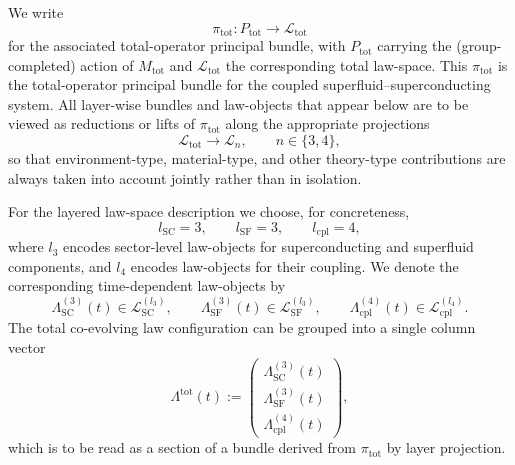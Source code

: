 \documentclass[11pt]{book}
\theoremstyle{plain}
\theoremstyle{definition}
\theoremstyle{remark}
\begin{document}
We write
\begin{equation}
  \pi_{\mathrm{tot}} : P_{\mathrm{tot}} \to \mathcal{L}_{\mathrm{tot}}
\end{equation}
for the associated total-operator principal bundle, with $P_{\mathrm{tot}}$
carrying the (group-completed) action of $M_{\mathrm{tot}}$ and
$\mathcal{L}_{\mathrm{tot}}$ the corresponding total law-space. This
$\pi_{\mathrm{tot}}$ is the total-operator principal bundle for the
coupled superfluid--superconducting system. All layer-wise bundles and
law-objects that appear below are to be viewed as reductions or lifts of
$\pi_{\mathrm{tot}}$ along the appropriate projections
\begin{equation}
  \mathcal{L}_{\mathrm{tot}}
  \longrightarrow
  \mathcal{L}_n, \qquad n\in\{3,4\},
\end{equation}
so that environment-type, material-type, and other theory-type
contributions are always taken into account jointly rather than in
isolation.

For the layered law-space description we choose, for concreteness,
\begin{equation}
  l_{\mathrm{SC}} = 3,
  \qquad
  l_{\mathrm{SF}} = 3,
  \qquad
  l_{\mathrm{cpl}} = 4,
\end{equation}
where $l_3$ encodes sector-level law-objects for superconducting and
superfluid components, and $l_4$ encodes law-objects for their coupling.
We denote the corresponding time-dependent law-objects by
\begin{equation}
  \Lambda_{\mathrm{SC}}^{(3)}(t)
    \in \mathcal{L}_{\mathrm{SC}}^{(l_3)},
  \qquad
  \Lambda_{\mathrm{SF}}^{(3)}(t)
    \in \mathcal{L}_{\mathrm{SF}}^{(l_3)},
  \qquad
  \Lambda_{\mathrm{cpl}}^{(4)}(t)
    \in \mathcal{L}_{\mathrm{cpl}}^{(l_4)}.
\end{equation}
The total co-evolving law configuration can be grouped into a single
column vector
\begin{equation}
  \Lambda^{\mathrm{tot}}(t)
  :=
  \begin{pmatrix}
    \Lambda_{\mathrm{SC}}^{(3)}(t) \\
    \Lambda_{\mathrm{SF}}^{(3)}(t) \\
    \Lambda_{\mathrm{cpl}}^{(4)}(t)
  \end{pmatrix},
\end{equation}
which is to be read as a section of a bundle derived from
$\pi_{\mathrm{tot}}$ by layer projection.
\end{document}
